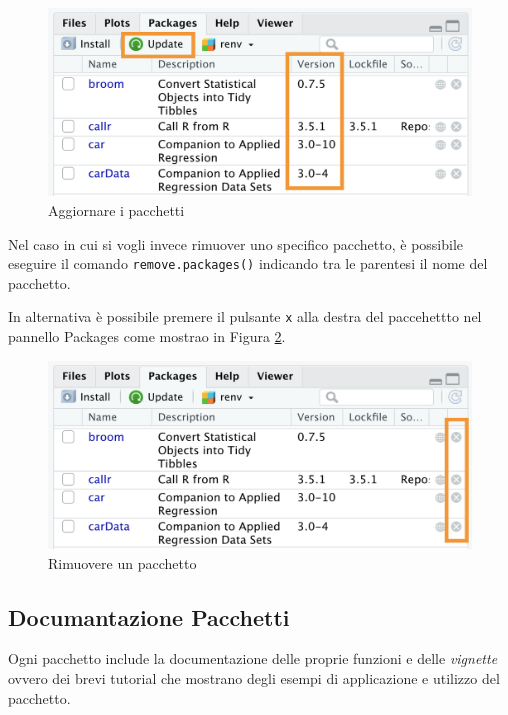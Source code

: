 \documentclass[
]{book}
\begin{document}
\begin{figure}

{\centering \includegraphics[width=0.65\linewidth]{images/library-version} 

}

\caption{Aggiornare i pacchetti}\label{fig:library-version}
\end{figure}

Nel caso in cui si vogli invece rimuover uno specifico pacchetto, è possibile eseguire il comando \texttt{remove.packages()} indicando tra le parentesi il nome del pacchetto.

In alternativa è possibile premere il pulsante \texttt{x} alla destra del paccehettto nel pannello Packages come mostrao in Figura \ref{fig:library-remove}.

\begin{figure}

{\centering \includegraphics[width=0.65\linewidth]{images/library-remove} 

}

\caption{Rimuovere un pacchetto}\label{fig:library-remove}
\end{figure}

\hypertarget{documantazione-pacchetti}{%
\subsection{Documantazione Pacchetti}\label{documantazione-pacchetti}}

Ogni pacchetto include la documentazione delle proprie funzioni e delle \emph{vignette} ovvero dei brevi tutorial che mostrano degli esempi di applicazione e utilizzo del pacchetto.
\end{document}

